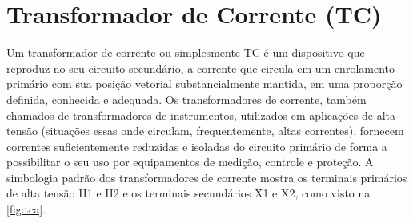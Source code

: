 \documentclass[a5paper]{ufsc-thesis}
\begin{document}
\section{Transformador de Corrente (TC)}
Um transformador de corrente ou simplesmente TC é um dispositivo que reproduz no seu circuito secundário, a corrente que circula em um enrolamento primário com sua posição vetorial substancialmente mantida, em uma proporção definida, conhecida e adequada. Os transformadores de corrente, também chamados de transformadores de instrumentos, utilizados em aplicações de alta tensão (situações essas onde circulam, frequentemente, altas correntes), fornecem correntes suficientemente reduzidas e isoladas do circuito primário de forma a possibilitar o seu uso por equipamentos de medição, controle e proteção. A simbologia padrão dos transformadores de corrente mostra os terminais primários de alta tensão H1 e H2 e os terminais secundários X1 e X2, como visto na \autoref{fig:tca}.
\end{document}
